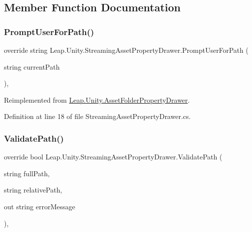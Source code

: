 \subsection{Member Function Documentation}
\mbox{\label{class_leap_1_1_unity_1_1_streaming_asset_property_drawer_a47389f0e29b9aae610112e71a900b3c1}} 
\subsubsection{\texorpdfstring{PromptUserForPath()}{PromptUserForPath()}}
{\footnotesize\ttfamily override string Leap.\+Unity.\+Streaming\+Asset\+Property\+Drawer.\+Prompt\+User\+For\+Path (\begin{DoxyParamCaption}\item[{string}]{current\+Path }\end{DoxyParamCaption})\hspace{0.3cm}{\ttfamily [protected]}, {\ttfamily [virtual]}}



Reimplemented from \mbox{\hyperlink{class_leap_1_1_unity_1_1_asset_folder_property_drawer_adf5a06cc37ba9285efd63ac70c08c5d0}{Leap.\+Unity.\+Asset\+Folder\+Property\+Drawer}}.



Definition at line 18 of file Streaming\+Asset\+Property\+Drawer.\+cs.

\mbox{\label{class_leap_1_1_unity_1_1_streaming_asset_property_drawer_aae138f9f79b66b7da1943b14524d795f}} 
\subsubsection{\texorpdfstring{ValidatePath()}{ValidatePath()}}
{\footnotesize\ttfamily override bool Leap.\+Unity.\+Streaming\+Asset\+Property\+Drawer.\+Validate\+Path (\begin{DoxyParamCaption}\item[{string}]{full\+Path,  }\item[{string}]{relative\+Path,  }\item[{out string}]{error\+Message }\end{DoxyParamCaption})\hspace{0.3cm}{\ttfamily [protected]}, {\ttfamily [virtual]}}



